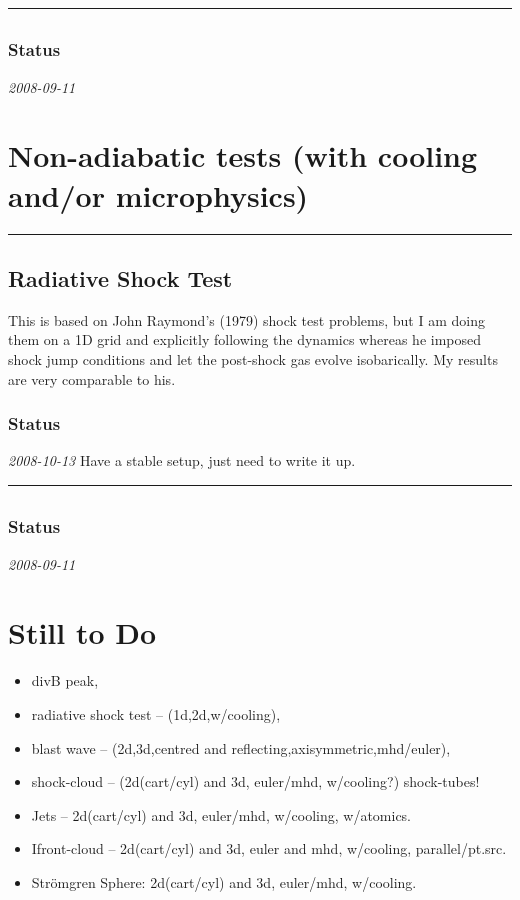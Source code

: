 \documentclass[11pt]{article}
\begin{document}
\vspace{0.4cm} \hrule
\subsection{}
\subsubsection{Status}
\textit{2008-09-11}

\section{Non-adiabatic tests (with cooling and/or microphysics)}
\vspace{0.4cm} \hrule
\subsection{Radiative Shock Test}
This is based on John Raymond's (1979) shock test problems, but I am
doing them on a 1D grid and explicitly following the dynamics whereas
he imposed shock jump conditions and let the post-shock gas evolve
isobarically.  My results are very comparable to his.
\subsubsection{Status}
\textit{2008-10-13} Have a stable setup, just need to write it up.

\vspace{0.4cm} \hrule
\subsection{}
\subsubsection{Status}
\textit{2008-09-11}

\section{Still to Do}
\begin{itemize}
\item divB peak,
\item radiative shock test -- (1d,2d,w/cooling),
\item blast wave -- (2d,3d,centred and reflecting,axisymmetric,mhd/euler),
\item shock-cloud -- (2d(cart/cyl) and 3d, euler/mhd, w/cooling?)
  shock-tubes!
\item Jets -- 2d(cart/cyl) and 3d, euler/mhd, w/cooling, w/atomics.
\item Ifront-cloud -- 2d(cart/cyl) and 3d, euler and mhd, w/cooling,
  parallel/pt.src.
\item Str\"omgren Sphere: 2d(cart/cyl) and 3d, euler/mhd, w/cooling.
\end{itemize}


\end{document}
